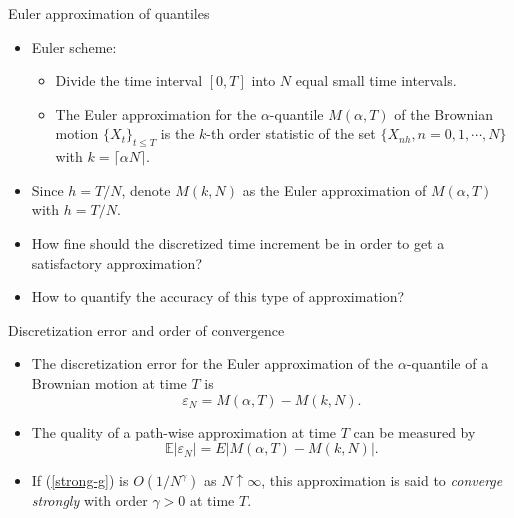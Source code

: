 \documentclass[cjk,10pt]{beamer}
\begin{document}


\begin{frame}{Euler approximation of quantiles}
\begin{itemize}
\item
Euler scheme:
\begin{itemize}
\item
Divide the time interval $[0,T]$ into $N$ equal small time intervals. 
\item
The Euler approximation for the $\alpha$-quantile $M(\alpha, T)$ of the Brownian motion $\{X_t\}_{t\leq T}$ is the $k$-th order statistic of the set $\{X_{nh},n=0,1,\cdots,N\}$ with $k= \lceil \alpha  N\rceil$. 
\end{itemize}
\item
Since $h=T/N$, denote $M(k,N)$ as the Euler approximation of $M(\alpha, T)$ with $h=T/N$. 
\item
How fine should the discretized time increment be in order to get a satisfactory approximation?
\item
How to quantify the accuracy of this type of approximation?
\end{itemize}
\end{frame}

\begin{frame}{Discretization error and order of convergence}
\begin{itemize}
\item
The discretization error for the Euler approximation of the $\alpha$-quantile of a Brownian motion at time $T$ is 
\begin{equation}
\varepsilon_N =M(\alpha, T)-M(k,N).
\end{equation}
\item
The quality of a path-wise approximation at time $T$ can be measured by 
\begin{equation}\label{strong-g}
\mathbb E|\varepsilon_N| =E|M(\alpha, T)-M(k,N)|.
\end{equation}
\item
If (\ref{strong-g}) is $O(1/N^\gamma)$ as $N \uparrow \infty$, this approximation is said to {\it converge strongly} with order $\gamma > 0 $ at time $T$.
\end{itemize}
\end{frame}
\end{document}
